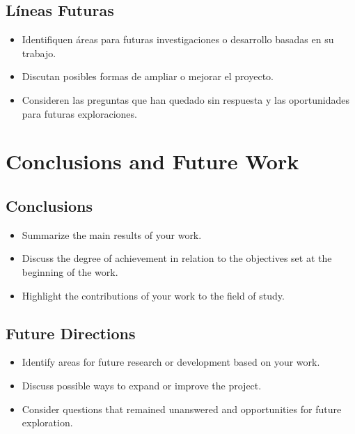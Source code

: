   \section{Líneas Futuras}
    \begin{itemize}
      \item Identifiquen áreas para futuras investigaciones o desarrollo basadas en su trabajo.
      \item Discutan posibles formas de ampliar o mejorar el proyecto.
      \item Consideren las preguntas que han quedado sin respuesta y las oportunidades para futuras exploraciones.
    \end{itemize}

\else
\chapter{Conclusions and Future Work}
  \section{Conclusions}
    \begin{itemize}
      \item Summarize the main results of your work.
      \item Discuss the degree of achievement in relation to the objectives set at the beginning of the work.
      \item Highlight the contributions of your work to the field of study.
    \end{itemize}
  
  \section{Future Directions}
    \begin{itemize}
      \item Identify areas for future research or development based on your work.
      \item Discuss possible ways to expand or improve the project.
      \item Consider questions that remained unanswered and opportunities for future exploration.
    \end{itemize}

\fi